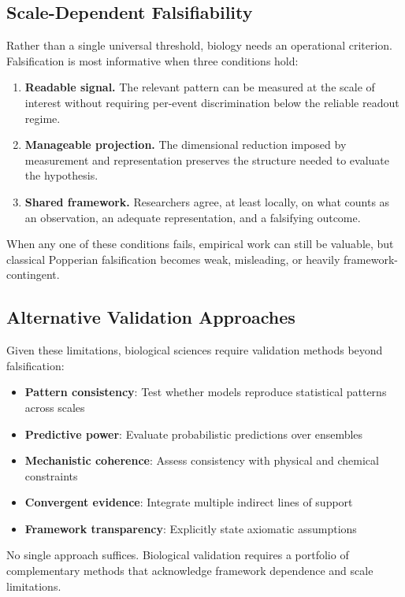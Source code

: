 \documentclass[12pt]{article}
\begin{document}
\subsection{Scale-Dependent Falsifiability}

Rather than a single universal threshold, biology needs an operational criterion. Falsification is most informative when three conditions hold:
\begin{enumerate}
\item \textbf{Readable signal.} The relevant pattern can be measured at the scale of interest without requiring per-event discrimination below the reliable readout regime.
\item \textbf{Manageable projection.} The dimensional reduction imposed by measurement and representation preserves the structure needed to evaluate the hypothesis.
\item \textbf{Shared framework.} Researchers agree, at least locally, on what counts as an observation, an adequate representation, and a falsifying outcome.
\end{enumerate}

When any one of these conditions fails, empirical work can still be valuable, but classical Popperian falsification becomes weak, misleading, or heavily framework-contingent.

\subsection{Alternative Validation Approaches}

Given these limitations, biological sciences require validation methods beyond falsification:

\begin{itemize}
\item \textbf{Pattern consistency}: Test whether models reproduce statistical patterns across scales
\item \textbf{Predictive power}: Evaluate probabilistic predictions over ensembles
\item \textbf{Mechanistic coherence}: Assess consistency with physical and chemical constraints
\item \textbf{Convergent evidence}: Integrate multiple indirect lines of support
\item \textbf{Framework transparency}: Explicitly state axiomatic assumptions
\end{itemize}

No single approach suffices. Biological validation requires a portfolio of complementary methods that acknowledge framework dependence and scale limitations.
\end{document}
